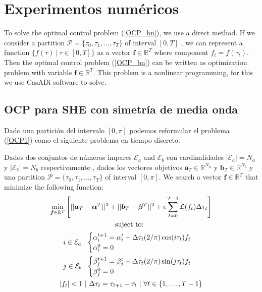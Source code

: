 \section{Experimentos numéricos}

To solve the optimal control problem (\ref{OCP_bn}), we use a direct method. 
If we consider a partition $\mathcal{P} = \{\tau_0,\tau_1,\dots,\tau_{T}\}$ of interval $[0,T]$ , we can represent a function $\{ f(\tau) \ | \ \tau \in [0,T]\}$ as a vector $\bm{f} \in \mathbb{R}^{T}$ where component $f_t = f(\tau_t)$. Then the optimal control problem (\ref{OCP_bn}) can be written as optimization problem with variable $\bm{f} \in \mathbb{R}^{T}$. This problem is a nonlinear programming, for this we use CasADi software to solve.


\subsection{OCP para SHE con simetría de media onda }

Dado una partición del intervalo $[0,\pi]$ podemos reformular el problema (\ref{OCP1}) como el siguiente problema en tiempo discreto:
\begin{problem}
    Dados dos conjuntos de números impares $\mathcal{E}_a$ and $\mathcal{E}_b$ con cardinalidades $|\mathcal{E}_a| = N_a$ y  $|\mathcal{E}_b| = N_b$ respectivamente , dados los vectores objetivos $\bm{a}_T  \in \mathbb{R}^{N_a}$ y $\bm{b}_T  \in \mathbb{R}^{N_b}$ y una  partition $\mathcal{P} = \{\tau_0,\tau_1,\dots,\tau_{T}\}$ of interval $[0,\pi]$. We search a vector $\bm{f} \in \mathbb{R}^{T}$ that minimize the following function:
    \begin{gather}
        \min_{\bm{f} \in \mathbb{R}^{T} } 
        \Bigg[ 
        || \bm{a}_T - \bm{\alpha}^{T}||^2 + 
        || \bm{b}_T - \bm{\beta}^{T}||^2 
        + \epsilon  \sum_{t=0}^{T-1} \mathcal{L}(f_{t}) \Delta\tau_t  \Bigg]  \\
        \notag \text{suject to: } \\
        \notag i \in \mathcal{E}_a \ \ 
        \begin{cases}
            \alpha_i^{t+1} = \alpha_i^{t} + \Delta \tau_t (2/\pi) \cos(i\tau_t) f_t \\
            \alpha_i^0 = 0
        \end{cases} \\
        \notag j \in \mathcal{E}_b \ \ 
        \begin{cases}
            \beta_j^{t+1} = \beta_j^{t} + \Delta \tau_t (2/\pi) \sin(j\tau_t) f_t \\
            \beta_j^0 = 0
        \end{cases} \\
        \notag |f_t| < 1 \ | \  \Delta \tau_t = \tau_{t+1} - \tau_{t} \ | \ \forall t \in \{1,\dots,T-1\}
    \end{gather}
\end{problem}

